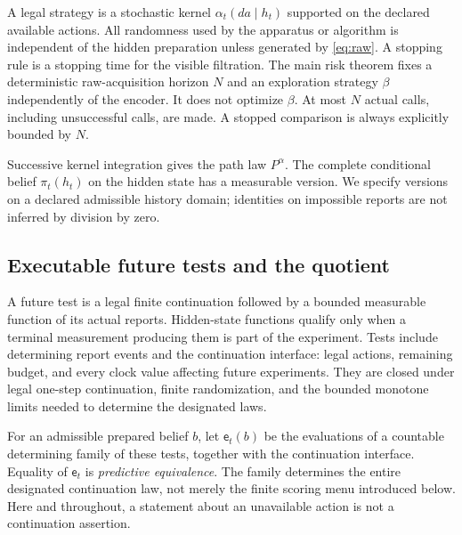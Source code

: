 A legal strategy is a stochastic kernel $\alpha_t(da\mid h_t)$ supported on the declared available actions. All randomness used by the apparatus or algorithm is independent of the hidden preparation unless generated by \eqref{eq:raw}. A stopping rule is a stopping time for the visible filtration. The main risk theorem fixes a deterministic raw-acquisition horizon $N$ and an exploration strategy $\beta$ independently of the encoder. It does not optimize $\beta$. At most $N$ actual calls, including unsuccessful calls, are made. A stopped comparison is always explicitly bounded by $N$.

Successive kernel integration gives the path law $P^\alpha$. The complete conditional belief $\pi_t(h_t)$ on the hidden state has a measurable version. We specify versions on a declared admissible history domain; identities on impossible reports are not inferred by division by zero.

\subsection{Executable future tests and the quotient}
A future test is a legal finite continuation followed by a bounded measurable function of its actual reports. Hidden-state functions qualify only when a terminal measurement producing them is part of the experiment. Tests include determining report events and the continuation interface: legal actions, remaining budget, and every clock value affecting future experiments. They are closed under legal one-step continuation, finite randomization, and the bounded monotone limits needed to determine the designated laws.

For an admissible prepared belief $b$, let $\mathsf e_t(b)$ be the evaluations of a countable determining family of these tests, together with the continuation interface. Equality of $\mathsf e_t$ is \emph{predictive equivalence}. The family determines the entire designated continuation law, not merely the finite scoring menu introduced below. Here and throughout, a statement about an unavailable action is not a continuation assertion.

